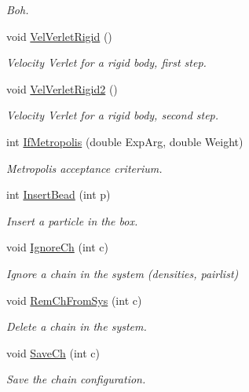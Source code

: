\begin{DoxyCompactItemize}
\begin{DoxyCompactList}\small\item\em Boh. \end{DoxyCompactList}\item 
void \hyperlink{classForces_a050e80ecdb61ccf749649d6ec6542ee7}{Vel\+Verlet\+Rigid} ()
\begin{DoxyCompactList}\small\item\em Velocity Verlet for a rigid body, first step. \end{DoxyCompactList}\item 
void \hyperlink{classForces_a3d421e17e32ee064077a14cc483a7c4e}{Vel\+Verlet\+Rigid2} ()
\begin{DoxyCompactList}\small\item\em Velocity Verlet for a rigid body, second step. \end{DoxyCompactList}\item 
int \hyperlink{classForces_a8b42f5fd80b4ad0cbf71649cd58f17ef}{If\+Metropolis} (double Exp\+Arg, double Weight)
\begin{DoxyCompactList}\small\item\em Metropolis acceptance criterium. \end{DoxyCompactList}\item 
int \hyperlink{classForces_a105420510a35a5f3ab726a943a279ce4}{Insert\+Bead} (int p)
\begin{DoxyCompactList}\small\item\em Insert a particle in the box. \end{DoxyCompactList}\item 
void \hyperlink{classForces_ada3b7b85ea783d27acfd5ff27165e4e2}{Ignore\+Ch} (int c)
\begin{DoxyCompactList}\small\item\em Ignore a chain in the system (densities, pairlist) \end{DoxyCompactList}\item 
void \hyperlink{classForces_a93ffd0cd932626a8b09911f2b3c96e10}{Rem\+Ch\+From\+Sys} (int c)
\begin{DoxyCompactList}\small\item\em Delete a chain in the system. \end{DoxyCompactList}\item 
void \hyperlink{classForces_a69e06a7f5662a462ed7b67428f1a8e69}{Save\+Ch} (int c)
\begin{DoxyCompactList}\small\item\em Save the chain configuration. \end{DoxyCompactList}\item 

\end{DoxyCompactItemize}
